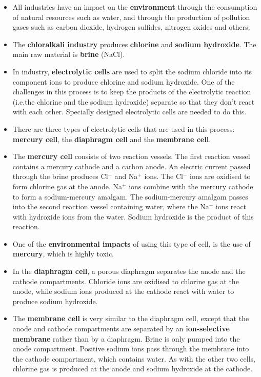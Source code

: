 \begin{itemize}
\item{All industries have an impact on the \textbf{environment} through the consumption of natural resources such as water, and through the production of pollution gases such as carbon dioxide, hydrogen sulfides, nitrogen oxides and others.}
\item{The \textbf{chloralkali industry} produces \textbf{chlorine} and \textbf{sodium hydroxide}. The main raw material is \textbf{brine} (NaCl).}
\item{In industry, \textbf{electrolytic cells} are used to split the sodium chloride into its component ions to produce chlorine and sodium hydroxide. One of the challenges in this process is to keep the products of the electrolytic reaction (i.e.\@ the chlorine and the sodium hydroxide) separate so that they don't react with each other. Specially designed electrolytic cells are needed to do this.}
\item{There are three types of electrolytic cells that are used in this process: \textbf{mercury cell}, the \textbf{diaphragm cell} and the \textbf{membrane cell}.}
\item{The \textbf{mercury cell} consists of two reaction vessels. The first reaction vessel contains a mercury cathode and a carbon anode. An electric current passed through the brine produces Cl$^{-}$ and Na$^{+}$ ions. The Cl$^{-}$ ions are oxidised to form chlorine gas at the anode. Na$^{+}$ ions combine with the mercury cathode to form a sodium-mercury amalgam.  The sodium-mercury amalgam passes into the second reaction vessel containing water, where the Na$^{+}$ ions react with hydroxide ions from the water. Sodium hydroxide is the product of this reaction.}
\item{One of the \textbf{environmental impacts} of using this type of cell, is the use of \textbf{mercury}, which is highly toxic.}
\item{In the \textbf{diaphragm cell}, a porous diaphragm separates the anode and the cathode compartments. Chloride ions are oxidised to chlorine gas at the anode, while sodium ions produced at the cathode react with water to produce sodium hydroxide.}
\item{The \textbf{membrane cell} is very similar to the diaphragm cell, except that the anode and cathode compartments are separated by an \textbf{ion-selective membrane} rather than by a diaphragm. Brine is only pumped into the anode compartment. Positive sodium ions pass through the membrane into the cathode compartment, which contains water. As with the other two cells, chlorine gas is produced at the anode and sodium hydroxide at the cathode.}

\end{itemize}
